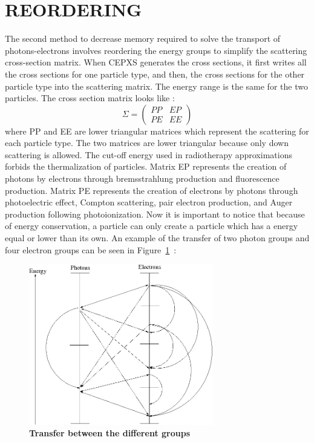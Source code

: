 \section{REORDERING}
The second method to decrease memory required to solve the transport of
photons-electrons involves reordering the energy groups to simplify the
scattering cross-section matrix. When CEPXS generates the cross sections,
it first writes all the cross sections for one particle type, and then, the cross
sections for the other particle type into the scattering matrix. The
energy range is the same for the two particles. The cross section matrix looks like :
\begin{equation}
\Sigma = 
\begin{pmatrix}
PP & EP\\
PE & EE
\end{pmatrix}
\end{equation}
where PP and EE are lower triangular matrices which represent the
scattering for each particle type. The two matrices are lower triangular
because only down scattering is allowed. The cut-off energy used in
radiotherapy approximations forbids the 
thermalization of particles. Matrix EP represents the creation of photons by
electrons through bremsstrahlung production and fluorescence production.
Matrix PE represents the creation of electrons by photons through photoelectric 
effect, Compton scattering, pair electron production, and Auger production 
following photoionization. Now it is important to notice that because 
of energy conservation, a particle can only create a particle which has a 
energy equal or lower than its own. An example of the transfer
of two photon groups and four electron groups can be seen in \hbox{Figure
\ref{joli} :}
\begin{figure}[H]
\begin{center}
\includegraphics[height=7cm]{group.png}
\caption{\bf{Transfer between the different groups}}
\label{joli}
\end{center}
\end{figure}
